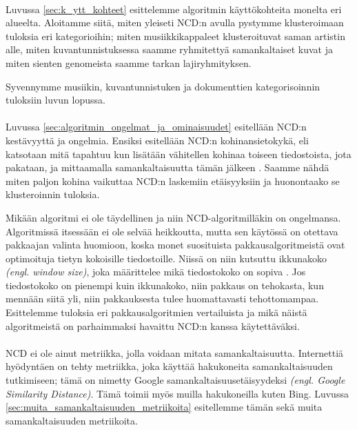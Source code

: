 \documentclass[11pt,finnish]{tktltiki2}
\theoremstyle{definition}
\theoremstyle{remark}
\newcommand{\engl}[1]{\emph{(engl. #1)}}
\begin{document}
\paragraph{} %
\label{par:intro-3}
  Luvussa \ref{sec:k_ytt_kohteet} esittelemme algoritmin käyttökohteita monelta eri alueelta. Aloitamme siitä, miten yleiseti NCD:n avulla pystymme klusteroimaan tuloksia eri kategorioihin; miten musiikkikappaleet klusteroituvat saman artistin alle, miten kuvantunnistuksessa saamme ryhmitettyä samankaltaiset kuvat ja miten sienten genomeista saamme tarkan lajiryhmityksen.

  Syvennymme musiikin, kuvantunnistuken ja dokumenttien kategorisoinnin tuloksiin luvun lopussa.


\paragraph{} %
\label{par:intro-4}
  Luvussa \ref{sec:algoritmin_ongelmat_ja_ominaisuudet} esitellään NCD:n kestävyyttä ja ongelmia. Ensiksi esitellään NCD:n kohinansietokykä, eli katsotaan mitä tapahtuu kun lisätään vähitellen kohinaa toiseen tiedostoista, jota pakataan, ja mittaamalla samankaltaisuutta tämän jälkeen \cite{4167725}. Saamme nähdä miten paljon kohina vaikuttaa NCD:n laskemiin etäisyyksiin ja huonontaako se klusteroinnin tuloksia.

  Mikään algoritmi ei ole täydellinen ja niin NCD-algoritmilläkin on ongelmansa. Algoritmissä itsessään ei ole selvää heikkoutta, mutta sen käytössä on otettava pakkaajan valinta huomioon, koska monet suosituista pakkausalgoritmeistä ovat optimoituja tietyn kokoisille tiedostoille. Niissä on niin kutsuttu ikkunakoko \engl{window size}, joka määrittelee mikä tiedostokoko on sopiva \cite{cebrian2005common}. Jos tiedostokoko on pienempi kuin ikkunakoko, niin pakkaus on tehokasta, kun mennään siitä yli, niin pakkauksesta tulee huomattavasti tehottomampaa. Esittelemme tuloksia eri pakkausalgoritmien vertailuista ja mikä näistä algoritmeistä on parhaimmaksi havaittu NCD:n kanssa käytettäväksi.


\paragraph{} %
\label{par:intro-5}
  NCD ei ole ainut metriikka, jolla voidaan mitata samankaltaisuutta. Internettiä hyödyntäen on tehty metriikka, joka käyttää hakukoneita samankaltaisuuden tutkimiseen; tämä on nimetty Google samankaltaisuusetäisyydeksi \engl{Google Similarity Distance}. Tämä toimii myös muilla hakukoneilla kuten Bing. Luvussa \ref{sec:muita_samankaltaisuuden_metriikoita} esitellemme tämän sekä muita samankaltaisuuden metriikoita.
\end{document}
